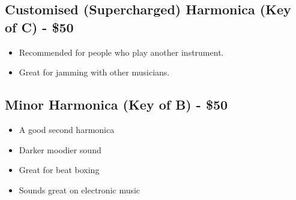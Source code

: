         \subsection*{Customised (Supercharged) Harmonica (Key of C) - \$50}
            \begin{itemize}
                \item Recommended for people who play another instrument.
                \item Great for jamming with other musicians.
            \end{itemize}
            
        \subsection*{Minor Harmonica (Key of B) - \$50}
            \begin{itemize}
                \item A good second harmonica
                \item Darker moodier sound
                \item Great for beat boxing
                \item Sounds great on electronic music
            \end{itemize} 
